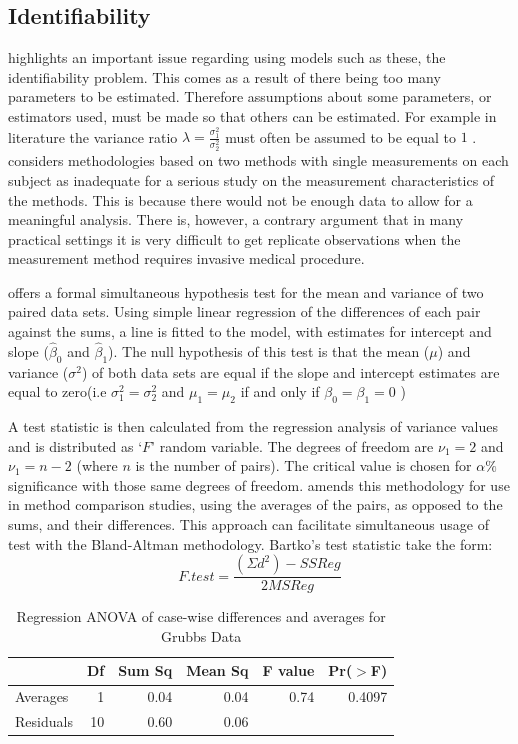 \documentclass[12pt, a4paper]{report}
\theoremstyle{plain}
\theoremstyle{definition}
\theoremstyle{remark}
\begin{document}
\subsection{Identifiability}
\citet{DunnSEME} highlights an important issue regarding using
models such as these, the identifiability problem. This comes as a
result of there being too many parameters to be estimated.
Therefore assumptions about some parameters, or estimators used,
must be made so that others can be estimated. For example in literature the variance
ratio $\lambda=\frac{\sigma^{2}_{1}}{\sigma^{2}_{2}}$
must often be assumed to be equal to $1$ \citep{linnet98}.\citet{DunnSEME} considers methodologies based on two methods with single measurements on each subject as inadequate for a serious
study on the measurement characteristics of the methods. This is
because there would not be enough data to allow for a meaningful
analysis. There is, however, a contrary argument that in many
practical settings it is very difficult to get replicate
observations when the measurement method requires invasive medical
procedure.

\citet{BB89} offers a formal simultaneous hypothesis test for the
mean and variance of two paired data sets. Using simple linear
regression of the differences of each pair against the sums, a
line is fitted to the model, with estimates for intercept and
slope ($\hat{\beta}_{0}$ and $\hat{\beta}_{1}$). The null
hypothesis of this test is that the mean ($\mu$) and variance
($\sigma^{2}$) of both data sets are equal if the slope and
intercept estimates are equal to zero(i.e $\sigma^{2}_{1} =
\sigma^{2}_{2}$ and $\mu_{1}=\mu_{2}$ if and only if $\beta_{0}=
\beta_{1}=0$ )

A test statistic is then calculated from the regression analysis
of variance values \citep{BB89} and is distributed as `$F$' random
variable. The degrees of freedom are $\nu_{1}=2$ and $\nu_{1}=n-2$
(where $n$ is the number of pairs). The critical value is chosen
for $\alpha\%$ significance with those same degrees of freedom.
\citet{Bartko} amends this methodology for use in method
comparison studies, using the averages of the pairs, as opposed to
the sums, and their differences. This approach can facilitate
simultaneous usage of test with the Bland-Altman methodology.
Bartko's test statistic take the form:
\[ F.test = \frac{(\Sigma d^{2})-SSReg}{2MSReg}
\]
\begin{table}[ht]
	\begin{center}
		\begin{tabular}{lrrrrr}
			\hline
			& Df & Sum Sq & Mean Sq & F value & Pr($>$F) \\
			\hline
			Averages & 1 & 0.04 & 0.04 & 0.74 & 0.4097 \\
			Residuals & 10 & 0.60 & 0.06 &  &  \\
			\hline
		\end{tabular}
		\caption{Regression ANOVA of case-wise differences and averages
			for Grubbs Data}
	\end{center}
\end{table}
\end{document}
